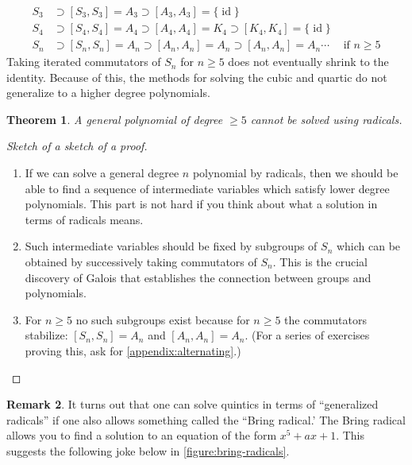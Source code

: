\documentclass[reqno, 12pt, letter]{article}
\theoremstyle{plain}
\newtheorem{theorem}{Theorem}[section]
\theoremstyle{definition}
\newtheorem{remark}[theorem]{Remark}
\theoremstyle{remark}
\numberwithin{equation}{section}
\DeclareMathOperator\id{id}
\begin{document}
\begin{align*}
	S_3 & \supset [S_3, S_3] = A_3 \supset [A_3, A_3] = \{ \id \}                          &                      \\
	S_4 & \supset [S_4, S_4] = A_4 \supset [A_4, A_4] = K_4 \supset [K_4, K_4] = \{ \id \} &                      \\
	S_n & \supset [S_n, S_n] = A_n \supset [A_n, A_n] = A_n \supset [A_n, A_n] = A_n \cdots                                & \text{ if } n \geq 5
\end{align*}
Taking iterated commutators of $S_n$ for $n \geq 5$ does not eventually shrink to the identity. Because of this, the methods for solving the cubic and quartic do not generalize to a higher degree polynomials.
\begin{theorem}
	A general polynomial of degree $ \ge 5$ cannot be solved using radicals.
\end{theorem}
\begin{proof}[Sketch of a sketch of a proof] $ $
	\begin{enumerate}
		\item If we can solve a general degree $ n$ polynomial by radicals, then we should be able to find a sequence of intermediate variables which satisfy lower degree polynomials. {This part is not hard if you think about what a solution in terms of radicals means.}
		\item Such intermediate variables should be fixed by subgroups of $ S_n$ which can be obtained by successively taking commutators of $ S_n$. {This is the crucial discovery of Galois that establishes the connection between groups and polynomials.}
		\item For $ n \ge 5$ no such subgroups exist because for $ n \ge 5$ the commutators stabilize: $[S_n, S_n] = A_n$ and $ [A_n, A_n] = A_n$.
		(For a series of exercises proving this, ask for \autoref{appendix:alternating}.)
	\end{enumerate}
\end{proof}

\begin{remark}
	\label{remark:}
	It turns out that one can solve quintics in terms of ``generalized
	radicals'' if one also allows something called the
	``Bring radical.'
	The Bring radical allows you to find a solution
	to an equation of the form $x^5 + ax + 1$.
	This suggests the following joke below in \autoref{figure:bring-radicals}.
\end{remark}
\end{document}
